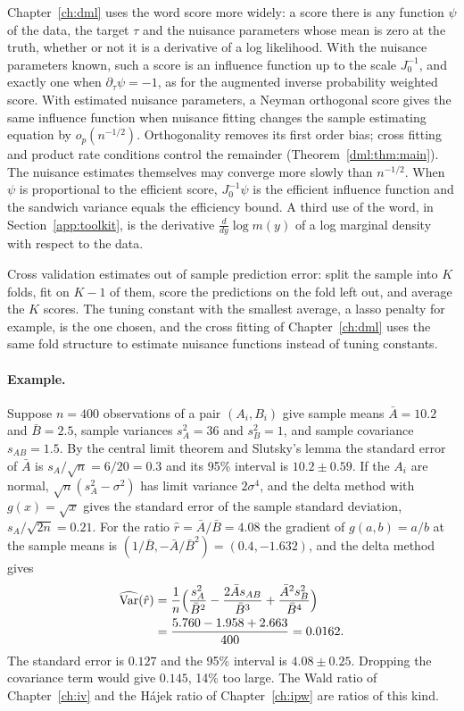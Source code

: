 Chapter~\ref{ch:dml} uses the word score more widely: a score there is any function $\psi$ of the data, the target $\tau$ and the nuisance parameters whose mean is zero at the truth, whether or not it is a derivative of a log likelihood. With the nuisance parameters known, such a score is an influence function up to the scale $J_0^{-1}$, and exactly one when $\partial_\tau\psi = -1$, as for the augmented inverse probability weighted score. With estimated nuisance parameters, a Neyman orthogonal score gives the same influence function when nuisance fitting changes the sample estimating equation by $o_p(n^{-1/2})$. Orthogonality removes its first order bias; cross fitting and product rate conditions control the remainder (Theorem~\ref{dml:thm:main}). The nuisance estimates themselves may converge more slowly than $n^{-1/2}$. When $\psi$ is proportional to the efficient score, $J_0^{-1}\psi$ is the efficient influence function and the sandwich variance equals the efficiency bound. A third use of the word, in Section~\ref{app:toolkit}, is the derivative $\frac{d}{dy}\log m(y)$ of a log marginal density with respect to the data.

Cross validation estimates out of sample prediction error: split the sample into $K$ folds, fit on $K - 1$ of them, score the predictions on the fold left out, and average the $K$ scores. The tuning constant with the smallest average, a lasso penalty for example, is the one chosen, and the cross fitting of Chapter~\ref{ch:dml} uses the same fold structure to estimate nuisance functions instead of tuning constants.

\paragraph{Example.} Suppose $n = 400$ observations of a pair $(A_i, B_i)$ give sample means $\bar A = 10.2$ and $\bar B = 2.5$, sample variances $s_A^2 = 36$ and $s_B^2 = 1$, and sample covariance $s_{AB} = 1.5$. By the central limit theorem and Slutsky's lemma the standard error of $\bar A$ is $s_A/\sqrt{n} = 6/20 = 0.3$ and its 95\% interval is $10.2 \pm 0.59$. If the $A_i$ are normal, $\sqrt{n}(s_A^2 - \sigma^2)$ has limit variance $2\sigma^4$, and the delta method with $g(x) = \sqrt{x}$ gives the standard error of the sample standard deviation, $s_A/\sqrt{2n} = 0.21$. For the ratio $\hat r = \bar A/\bar B = 4.08$ the gradient of $g(a, b) = a/b$ at the sample means is $(1/\bar B, -\bar A/\bar B^2) = (0.4, -1.632)$, and the delta method gives
\begin{align*}
\widehat{\mathrm{Var}}(\hat r) &= \frac{1}{n}\Bigl(\frac{s_A^2}{\bar B^2} - \frac{2\bar A s_{AB}}{\bar B^3} + \frac{\bar A^2 s_B^2}{\bar B^4}\Bigr) \\
&= \frac{5.760 - 1.958 + 2.663}{400} = 0.0162.
\end{align*}
The standard error is $0.127$ and the 95\% interval is $4.08 \pm 0.25$. Dropping the covariance term would give $0.145$, 14\% too large. The Wald ratio of Chapter~\ref{ch:iv} and the H\'ajek ratio of Chapter~\ref{ch:ipw} are ratios of this kind.

